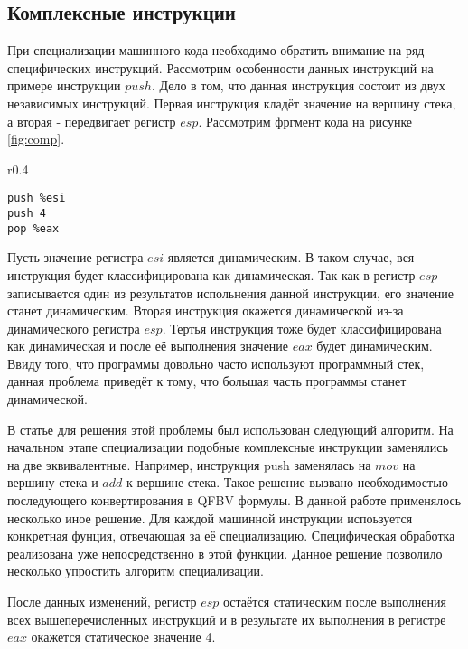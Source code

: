 \documentclass{spbau-diploma}
\begin{document}
\subsection{ Комплексные инструкции}
При специализации машинного кода необходимо обратить внимание на ряд специфических инструкций. Рассмотрим особенности данных инструкций на примере инструкции $push$. Дело в том, что данная инструкция состоит из двух независимых инструкций. Первая инструкция кладёт значение на вершину стека, а вторая - передвигает регистр $esp$. Рассмотрим фргмент кода на рисунке \ref{fig:comp}.
\begin{wrapfigure}{r}{0.4\textwidth}
\begin{lstlisting}[xleftmargin = 20pt]
push %esi
push 4
pop %eax
\end{lstlisting}
\caption{Фрагмент кода}
\label{fig:comp}
\end{wrapfigure}
Пусть значение регистра $esi$ является динамическим. В таком случае, вся инструкция будет классифицирована как динамическая. Так как в регистр $esp$ записывается один из результатов испольнения данной инструкции, его значение станет динамическим. Вторая инструкция окажется динамической из-за динамического регистра $esp$. Тертья инструкция тоже будет классифицирована как  динамическая и после её выполнения значение $eax$ будет динамическим. Ввиду того, что программы довольно часто используют программный стек, данная проблема приведёт к тому, что большая часть программы станет динамической.

В статье \cite{PEMC} для решения этой проблемы был использован следующий алгоритм. На начальном этапе специализации подобные комплексные инструкции заменялись на две эквивалентные. Например, инструкция push заменялась на $mov$ на вершину стека и $add$ к вершине стека. Такое решение вызвано необходимостью последующего конвертирования в QFBV формулы. В данной работе применялось несколько иное решение. Для каждой машинной инструкции испоьзуется конкретная фунция, отвечающая за её специализацию. Специфическая обработка реализована уже непосредственно в этой функции. Данное решение позволило несколько упростить алгоритм специализации.

После данных изменений, регистр $esp$ остаётся статическим после выполнения всех вышеперечисленных инструкций и в результате их выполнения в регистре $eax$ окажется статическое значение 4.
\end{document}
